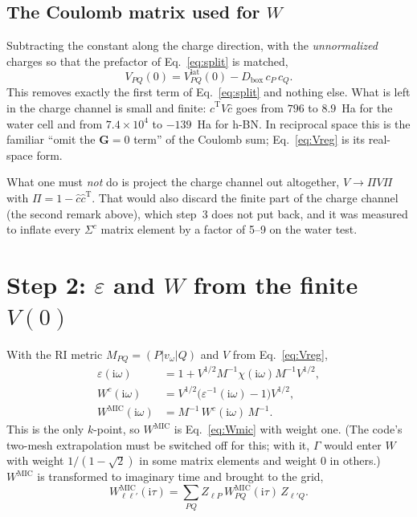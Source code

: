 \documentclass[11pt,a4paper]{article}
\newcommand{\bG}{\mathbf{G}}
\newcommand{\ii}{\mathrm{i}}
\newcommand{\MIC}{\mathrm{MIC}}
\newcommand{\Tr}{\mathrm{T}}
\newcommand{\lat}{\mathrm{lat}}
\begin{document}
\subsection{The Coulomb matrix used for $W$}

Subtracting the constant along the charge direction, with the \emph{unnormalized} charges so
that the prefactor of Eq.~\eqref{eq:split} is matched,
\begin{equation}
  V_{PQ}(0) = V^\lat_{PQ}(0) - D_\mathrm{box}\, c_P\, c_Q .
  \label{eq:Vreg}
\end{equation}
This removes exactly the first term of Eq.~\eqref{eq:split} and nothing else. What is left in
the charge channel is small and finite: $\hat c^\Tr V\hat c$ goes from $796$ to $8.9$~Ha for the
water cell and from $7.4\times10^{4}$ to $-139$~Ha for h-BN. In reciprocal space this is the
familiar ``omit the $\bG=0$ term'' of the Coulomb sum; Eq.~\eqref{eq:Vreg} is its real-space
form.

What one must \emph{not} do is project the charge channel out altogether,
$V\to\Pi V\Pi$ with $\Pi = 1-\hat c\hat c^\Tr$. That would also discard the finite part of the
charge channel (the second remark above), which step~3 does not put back, and it was measured
to inflate every $\Sigma^c$ matrix element by a factor of 5--9 on the water test.

\section{Step 2: $\varepsilon$ and $W$ from the finite $V(0)$}
\label{sec:step2}
\label{sec:W}

With the RI metric $M_{PQ} = (P|v_\omega|Q)$ and $V$ from Eq.~\eqref{eq:Vreg},
\begin{align}
  \varepsilon(\ii\omega) &= 1 + V^{1/2} M^{-1}\chi(\ii\omega) M^{-1} V^{1/2},
  \label{eq:eps}\\
  W^c(\ii\omega) &= V^{1/2}\big(\varepsilon^{-1}(\ii\omega) - 1\big)V^{1/2},
  \label{eq:Wc}\\
  W^{\MIC}(\ii\omega) &= M^{-1}\, W^c(\ii\omega)\, M^{-1}.
  \label{eq:Wmic}
\end{align}
This is the only $k$-point, so $W^\MIC$ is Eq.~\eqref{eq:Wmic} with weight one. (The code's
two-mesh extrapolation must be switched off for this; with it, $\Gamma$ would enter $W$ with
weight $1/(1-\sqrt2)$ in some matrix elements and weight 0 in others.) $W^\MIC$ is transformed
to imaginary time and brought to the grid,
\begin{equation}
  W^{\MIC}_{\ell\ell'}(\ii\tau) = \sum_{PQ} Z_{\ell P}\, W^{\MIC}_{PQ}(\ii\tau)\, Z_{\ell'Q}.
  \label{eq:W_grid}
\end{equation}
\end{document}
